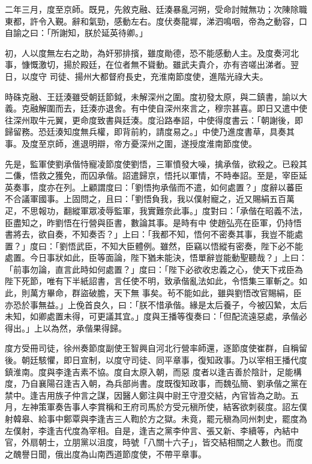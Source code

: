 \begin{pinyinscope}
 二年三月，度至京師。既見，先敘克融、廷湊暴亂河朔，受命討賊無功；次陳除職東都，許令入覲。辭和氣勁，感動左右。度伏奏龍墀，涕泗鳴咽，帝為之動容，口自諭之曰：「所謝知，朕於延英待卿。」



 初，人以度無左右之助，為奸邪排擯，雖度勛德，恐不能感動人主。及度奏河北事，慷慨激切，揚於殿廷，在位者無不聳動。雖武夫貴介，亦有咨嗟出涕者。翌日，以度守
 司徒、揚州大都督府長史，充淮南節度使，進階光祿大夫。



 時硃克融、王廷湊雖受朝廷節鉞，未解深州之圍。度初發太原，與二鎮書，諭以大義。克融解圍而去，廷湊亦退舍。有中使自深州來言之，穆宗甚喜。即日又遣中使往深州取牛元翼，更命度致書與廷湊。度沿路奉詔，中使得度書云：「朝謝後，即歸留務。恐廷湊知度無兵權，即背前約，請度易之。」中使乃進度書草，具奏其事。及度至京師，進退明辯，帝方憂深州之圍，遂授度淮南節度使。



 先是，監軍使劉承偕恃寵凌節度使劉悟，三軍憤發大噪，擒承偕，欲殺之。已殺其二傔，悟救之獲免，而囚承偕。詔遣歸京，悟托以軍情，不時奉詔。至是，宰臣延英奏事，度亦在列。上顧謂度曰：「劉悟拘承偕而不遣，如何處置？」度辭以蕃臣不合議軍國事。上固問之，且曰：「劉悟負我，我以僕射寵之，近又賜絹五百萬疋，不思報功，翻縱軍眾凌辱監軍，我實難奈此事。」度對曰：「承偕在昭義不法，臣盡知之，昨劉悟在行營與臣書，數論其事。是時有中
 使趙弘亮在臣軍，仍持悟書將去，欲自奏，不知奏否？」上曰：「我都不知，悟何不密奏其事，我豈不能處置？」度曰：「劉悟武臣，不知大臣體例。雖然，臣竊以悟縱有密奏，陛下必不能處置。今日事狀如此，臣等面論，陛下猶未能決，悟單辭豈能動聖聽哉？」上曰：「前事勿論，直言此時如何處置？」度曰：「陛下必欲收忠義之心，使天下戎臣為陛下死節，唯有下半紙詔書，言任使不明，致承偕亂法如此，令悟集三軍斬之。如此，則萬方畢命，群盜破膽，天下無
 事矣。茍不能如此，雖與劉悟改官賜絹，臣亦恐於事無益。」上俛首良久，曰：「朕不惜承偕。緣是太后養子，今被囚縶，太后未知，如卿處置未得，可更議其宜。」度與王播等復奏曰：「但配流遠惡處，承偕必得出。」上以為然，承偕果得歸。



 度方受冊司徒，徐州奏節度副使王智興自河北行營率師還，逐節度使崔群，自稱留後。朝廷駭懼，即日宣制，以度守司徒、同平章事，復知政事。乃以宰相王播代度鎮淮南。度與李逢吉素不協。度自太原入朝，而惡
 度者以逢吉善於陰計，足能構度，乃自襄陽召逢吉入朝，為兵部尚書。度既復知政事，而魏弘簡、劉承偕之黨在禁中。逢吉用族子仲言之謀，因醫人鄭注與中尉王守澄交結，內官皆為之助。五月，左神策軍奏告事人李賞稱和王府司馬於方受元稹所使，結客欲刺裴度。詔左僕射韓皋、給事中鄭覃與李逢吉三人鞫於方之獄。未竟，罷元稹為同州刺史，罷度為左僕射，李逢吉代度為宰相。自是，逢吉之黨李仲言、張又新、李續等，內結中
 官，外扇朝士，立朋黨以沮度，時號「八關十六子」，皆交結相關之人數也。而度之醜譽日聞，俄出度為山南西道節度使，不帶平章事。




\end{pinyinscope}
